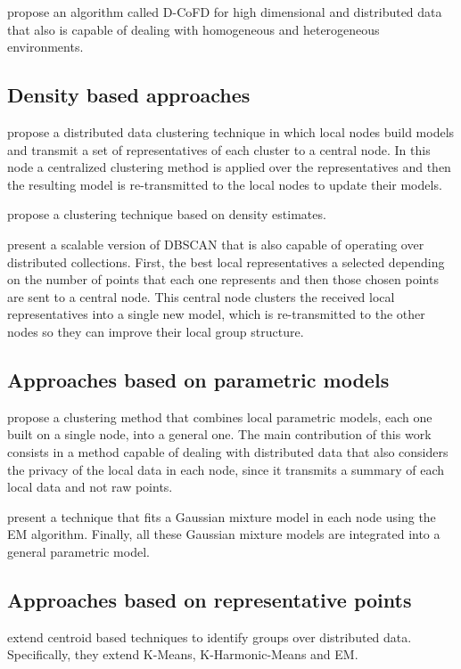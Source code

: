 \documentclass[a4paper]{article}
\begin{document}
\cite{LZO03} propose an algorithm called D-CoFD for high dimensional and distributed data that also is capable of dealing with homogeneous and heterogeneous environments.


\subsection{Density based approaches}
\cite{JKP03} propose a distributed data clustering technique in which local nodes build models and transmit a set of representatives of each cluster to a central node. In this node a centralized clustering method is applied over the representatives and then the resulting model is re-transmitted to the local nodes to update their models.

\cite{KLM03} propose a clustering technique based on density estimates.

\cite{JKP04} present a scalable version of DBSCAN that is also capable of operating over distributed collections. First, the best local representatives a selected depending on the number of points that each one represents and then those chosen points are sent to a central node. This central node clusters the received local representatives into a single new model, which is re-transmitted to the other nodes so they can improve their local group structure.


\subsection{Approaches based on parametric models}
\cite{MG03} propose a clustering method that combines local parametric models, each one built on a single node, into a general one. The main contribution of this work consists in a method capable of dealing with distributed data that also considers the privacy of the local data in each node, since it transmits a summary of each local data and not raw points.

\cite{KKPS05} present a technique that fits a Gaussian mixture model in each node using the EM algorithm. Finally, all these Gaussian mixture models are integrated into a general parametric model.


\subsection{Approaches based on representative points}

\cite{FZ00} extend centroid based techniques to identify groups over distributed data. Specifically, they extend K-Means, K-Harmonic-Means and EM.
\end{document}
